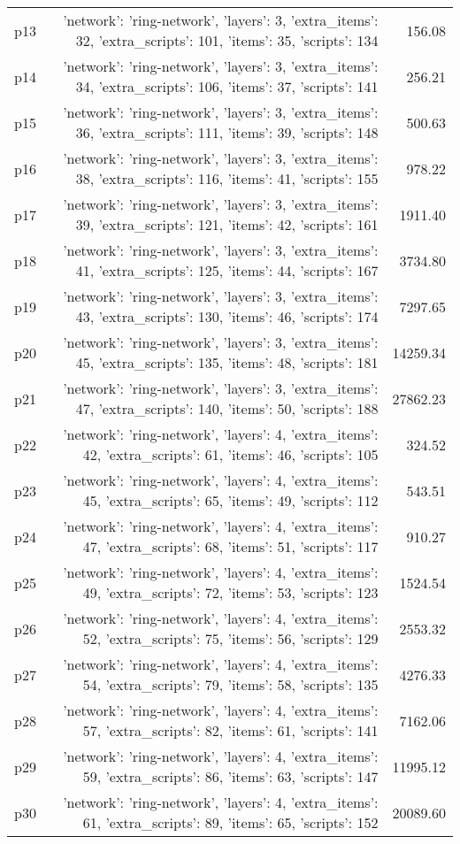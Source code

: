 \documentclass{article}
\begin{document}
\begin{center}
\begin{tabular}{@{}l|r|r@{}}
  p13&{'network': 'ring-network', 'layers': 3, 'extra\_items': 32, 'extra\_scripts': 101, 'items': 35, 'scripts': 134}&156.08\\
  p14&{'network': 'ring-network', 'layers': 3, 'extra\_items': 34, 'extra\_scripts': 106, 'items': 37, 'scripts': 141}&256.21\\
  p15&{'network': 'ring-network', 'layers': 3, 'extra\_items': 36, 'extra\_scripts': 111, 'items': 39, 'scripts': 148}&500.63\\
  p16&{'network': 'ring-network', 'layers': 3, 'extra\_items': 38, 'extra\_scripts': 116, 'items': 41, 'scripts': 155}&978.22\\
  p17&{'network': 'ring-network', 'layers': 3, 'extra\_items': 39, 'extra\_scripts': 121, 'items': 42, 'scripts': 161}&1911.40\\
  p18&{'network': 'ring-network', 'layers': 3, 'extra\_items': 41, 'extra\_scripts': 125, 'items': 44, 'scripts': 167}&3734.80\\
  p19&{'network': 'ring-network', 'layers': 3, 'extra\_items': 43, 'extra\_scripts': 130, 'items': 46, 'scripts': 174}&7297.65\\
  p20&{'network': 'ring-network', 'layers': 3, 'extra\_items': 45, 'extra\_scripts': 135, 'items': 48, 'scripts': 181}&14259.34\\
  p21&{'network': 'ring-network', 'layers': 3, 'extra\_items': 47, 'extra\_scripts': 140, 'items': 50, 'scripts': 188}&27862.23\\
  p22&{'network': 'ring-network', 'layers': 4, 'extra\_items': 42, 'extra\_scripts': 61, 'items': 46, 'scripts': 105}&324.52\\
  p23&{'network': 'ring-network', 'layers': 4, 'extra\_items': 45, 'extra\_scripts': 65, 'items': 49, 'scripts': 112}&543.51\\
  p24&{'network': 'ring-network', 'layers': 4, 'extra\_items': 47, 'extra\_scripts': 68, 'items': 51, 'scripts': 117}&910.27\\
  p25&{'network': 'ring-network', 'layers': 4, 'extra\_items': 49, 'extra\_scripts': 72, 'items': 53, 'scripts': 123}&1524.54\\
  p26&{'network': 'ring-network', 'layers': 4, 'extra\_items': 52, 'extra\_scripts': 75, 'items': 56, 'scripts': 129}&2553.32\\
  p27&{'network': 'ring-network', 'layers': 4, 'extra\_items': 54, 'extra\_scripts': 79, 'items': 58, 'scripts': 135}&4276.33\\
  p28&{'network': 'ring-network', 'layers': 4, 'extra\_items': 57, 'extra\_scripts': 82, 'items': 61, 'scripts': 141}&7162.06\\
  p29&{'network': 'ring-network', 'layers': 4, 'extra\_items': 59, 'extra\_scripts': 86, 'items': 63, 'scripts': 147}&11995.12\\
  p30&{'network': 'ring-network', 'layers': 4, 'extra\_items': 61, 'extra\_scripts': 89, 'items': 65, 'scripts': 152}&20089.60
                            \end{tabular}
                            \end{center}
                    
\end{document}
